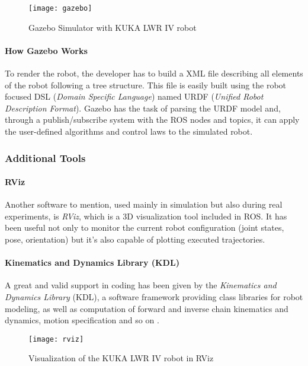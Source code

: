 \begin{figure}[H]
\centering
\texttt{[image: gazebo]} 
\caption{Gazebo Simulator with KUKA LWR IV robot}
\end{figure}


\paragraph{How Gazebo Works}
To render the robot, the developer has to build a XML file describing all elements of the robot following a tree structure. This file is easily built using the robot focused DSL (\textit{Domain Specific Language}) named URDF (\textit{Unified Robot Description Format}). Gazebo has the task of parsing the URDF model and, through a publish/subscribe system with the ROS nodes and topics, it can apply the user-defined algorithms and control laws to the simulated robot.

\subsubsection{Additional Tools}
\paragraph{RViz}
Another software to mention, used mainly in simulation but also during real experiments, is \textit{RViz}, which is a 3D visualization tool included in ROS. It has been useful not only to monitor the current robot configuration (joint states, pose, orientation) but it's also capable of plotting executed trajectories.

\paragraph{Kinematics and Dynamics Library (KDL)}
A great and valid support in coding has been given by the \textit{Kinematics and Dynamics Library} (KDL), a software framework providing class libraries for robot modeling, as well as computation of forward and inverse chain kinematics and dynamics, motion specification and so on \cite{webkdl}.

\begin{figure}[H]
\centering
\texttt{[image: rviz]} 
\caption{Visualization of the KUKA LWR IV robot in RViz}
\end{figure}